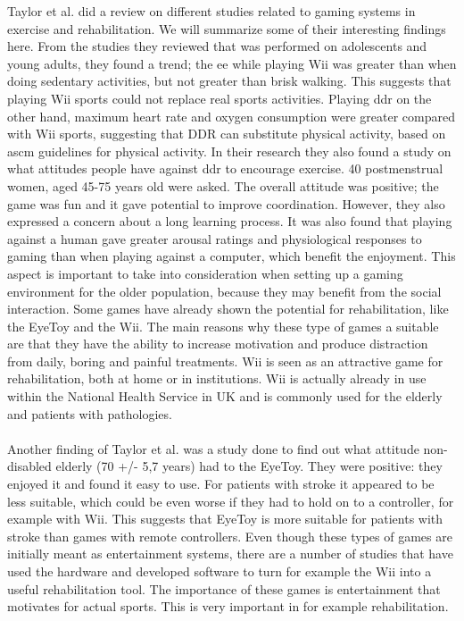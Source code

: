 Taylor et al. \cite{taylor2011activity} did a review on different studies related to gaming systems in exercise and rehabilitation. We will summarize some of their interesting findings here. From the studies they reviewed that was performed on adolescents and young adults, they found a trend; the  \ac{ee} while playing Wii was greater than when doing sedentary activities, but not greater than brisk walking. This suggests that playing Wii sports could not replace real sports activities. Playing \ac{ddr} on the other hand, maximum heart rate and oxygen consumption were greater compared with Wii sports, suggesting that DDR can substitute physical activity, based on \ac{ascm} guidelines for physical activity. In their research they also found a study on what attitudes people have against \ac{ddr} to encourage exercise. 40 postmenstrual women, aged 45-75 years old were asked. The overall attitude was positive; the game was fun and it gave potential to improve coordination. However, they also expressed a concern about a long learning process. It was also found that playing against a human gave greater arousal ratings and physiological responses to gaming than when playing against a computer, which benefit the enjoyment. This aspect is important to take into consideration when setting up a gaming environment for the older population, because they may benefit from the social interaction. Some games have already shown the potential for rehabilitation, like the EyeToy and the Wii. The main reasons why these type of games a suitable are that they have the ability to increase motivation and produce distraction from daily, boring and painful treatments. Wii is seen as an attractive game for rehabilitation, both at home or in institutions. Wii is actually already in use within the National Health Service in UK and is commonly used for the elderly and patients with pathologies.  \cite{taylor2011activity} \\ \\
Another finding of Taylor et al. was a study done to find out what attitude non-disabled elderly (70 +/- 5,7 years) had to the EyeToy. They were positive: they enjoyed it and found it easy to use. For patients with stroke it appeared to be less suitable, which could be even worse if they had to hold on to a controller, for example with Wii. This suggests that EyeToy is more suitable for patients with stroke than games with remote controllers.  
Even though these types of games are initially meant as entertainment systems, there are a number of studies that have used the hardware and developed software to turn for example the Wii into a useful rehabilitation tool. The importance of these games is entertainment that motivates for actual sports. This is very important in for example rehabilitation. \cite{taylor2011activity} \\ \\
